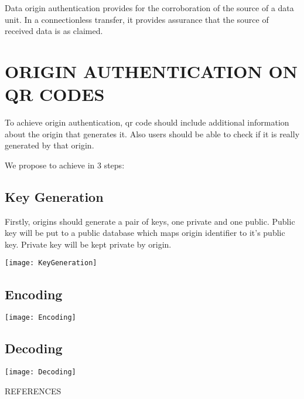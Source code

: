 \documentclass[12pt,journal,compsoc]{IEEEtran}
\begin{document}
Data origin authentication provides for the corroboration of the source
of a data unit. In a connectionless transfer, it provides assurance that
the source of received data is as claimed.


\section{ORIGIN AUTHENTICATION ON QR CODES}

To achieve origin authentication, qr code should include additional information about the origin that generates it. Also users should be able to check if it is really generated by that origin.

We propose to achieve in 3 steps: 


\subsection{Key Generation}

Firstly, origins should generate a pair of keys, one private and one public. Public key will be put to a public database which maps origin identifier to it's public key. Private key will be kept private by origin.


\begin{center}
\texttt{[image: KeyGeneration]}
\end{center}

\subsection{Encoding}
\begin{center}
\texttt{[image: Encoding]}
\end{center}


\subsection{Decoding}
\begin{center}
\texttt{[image: Decoding]}
\end{center}


\begin{thebibliography}{1}

REFERENCES

\end{thebibliography}
\end{document}
